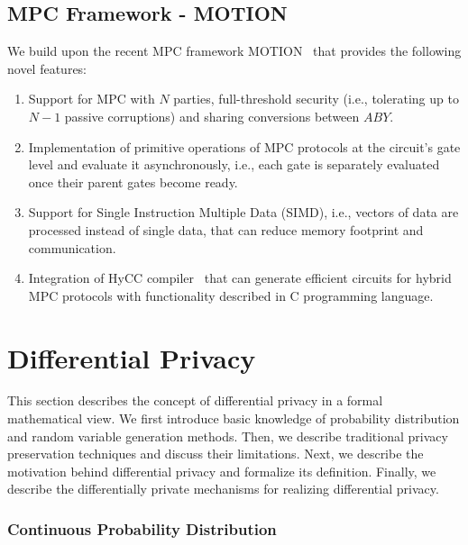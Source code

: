 \subsection{MPC Framework - MOTION}
\label{subsection:MOTIONFramework}
We build upon the recent MPC framework MOTION~\cite{braun2020motion} that provides the following novel features:
\begin{enumerate}
    \item Support for MPC with $N$ parties, full-threshold security (i.e., tolerating up to $N-1$ passive corruptions) and sharing conversions between $ABY$.
    \item Implementation of primitive operations of MPC protocols at the circuit's gate level and evaluate it asynchronously, i.e., each gate is separately evaluated once their parent gates become ready.
    \item Support for Single Instruction Multiple Data (SIMD), i.e., vectors of data are processed instead of single data, that can reduce memory footprint and communication.
    \item Integration of HyCC compiler~\cite{buscher2018hycc} that can generate efficient circuits for hybrid MPC protocols with functionality described in C programming language.
\end{enumerate}



\section{Differential Privacy}
\label{sec:differentialPrivacy}
This section describes the concept of differential privacy in a formal mathematical view. We first introduce basic knowledge of probability distribution and random variable generation methods. Then, we describe traditional privacy preservation techniques and discuss their limitations. Next, we describe the motivation behind differential privacy and formalize its definition. Finally, we describe the differentially private mechanisms for realizing differential privacy.


\subsubsection{Continuous Probability Distribution}
\label{subsubsec:ContinuousProbabilityDistribution}

